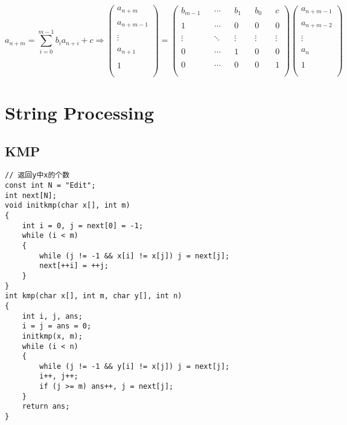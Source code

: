 \documentclass[twoside]{article}
\begin{document}
\begin{enumerate}
$$
a_{n+m}=\sum_{i=0}^{m-1}b_ia_{n+i}+c\Rightarrow
\left(
\begin{matrix}
 a_{n+m}    \\\\
 a_{n+m-1}  \\\\
 \vdots     \\\\
 a_{n+1}    \\\\
 1          \\\\
\end{matrix}
\right)
=
\left(
\begin{matrix}
 b_{m-1} && \cdots && b_1    && b_0    && c      \\\\
 1       && \cdots && 0      && 0      && 0      \\\\
 \vdots  && \ddots && \vdots && \vdots && \vdots \\\\
 0       && \cdots && 1      && 0      && 0      \\\\
 0       && \cdots && 0      && 0      && 1      \\\\
\end{matrix}
\right)
\left(
\begin{matrix}
 a_{n+m-1} \\\\
 a_{n+m-2} \\\\
 \vdots    \\\\
 a_n       \\\\
 1         \\\\
\end{matrix}
\right)
$$
\end{enumerate}
\clearpage\section{String Processing}
\subsection{KMP}
\begin{lstlisting}
// 返回y中x的个数
const int N = "Edit";
int next[N];
void initkmp(char x[], int m)
{
    int i = 0, j = next[0] = -1;
    while (i < m)
    {
        while (j != -1 && x[i] != x[j]) j = next[j];
        next[++i] = ++j;
    }
}
int kmp(char x[], int m, char y[], int n)
{
    int i, j, ans;
    i = j = ans = 0;
    initkmp(x, m);
    while (i < n)
    {
        while (j != -1 && y[i] != x[j]) j = next[j];
        i++, j++;
        if (j >= m) ans++, j = next[j];
    }
    return ans;
}
\end{lstlisting}
\end{document}
